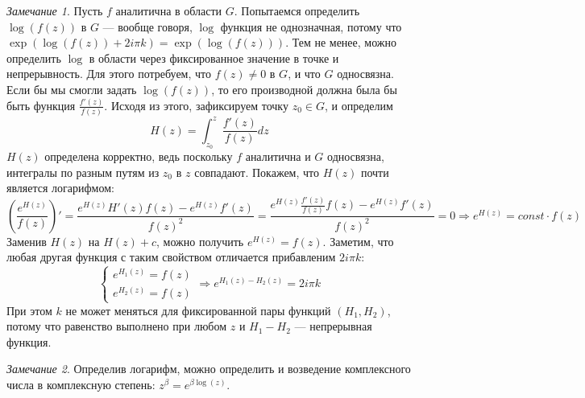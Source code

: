 \documentclass[12pt]{article}
\newcommand{\Ra}{\Rightarrow}
\theoremstyle{thmnote}
\theoremstyle{remark}
\newtheorem*{remark}{Замечание}
\theoremstyle{defnote}
\begin{document}
\begin{remark}
    Пусть $f$ аналитична в области $G$. Попытаемся определить $\log(f(z))$ в $G$ --- вообще говоря, $\log$ функция не однозначная, потому что $\exp(\log(f(z)) + 2 i \pi k) = \exp(\log(f(z)))$. Тем не менее, можно определить $\log$ в области через фиксированное значение в точке и непрерывность. Для этого потребуем, что $f(z) \neq 0$ в $G$, и что $G$ односвязна. Если бы мы смогли задать $\log(f(z))$, то его производной должна была бы быть функция $\frac{f'(z)}{f(z)}$. Исходя из этого, зафиксируем точку $z_0 \in G$, и определим
    \begin{equation*}
        H(z) = \int_{z_0}^{z} \frac{f'(z)}{f(z)} dz
    \end{equation*}
    $H(z)$ определена корректно, ведь поскольку $f$ аналитична и $G$ односвязна, интегралы по разным путям из $z_0$ в $z$ совпадают. Покажем, что $H(z)$ почти является логарифмом:
    \begin{equation*}
        \left( \frac{e^{H(z)}}{f(z)} \right)' = \frac{e^{H(z)} H'(z) f(z) - e^{H(z)} f'(z)}{f(z)^2} = \frac{e^{H(z)} \frac{f'(z)}{f(z)} f(z) - e^{H(z)} f'(z)}{f(z)^2} = 0 \Ra e^{H(z)} = const \cdot f(z)
    \end{equation*}
    Заменив $H(z)$ на $H(z) + c$, можно получить $e^{H(z)} = f(z)$. Заметим, что любая другая функция с таким свойством отличается прибавленим $2 i \pi k$:
    \begin{equation*}
        \begin{cases}
            e^{H_1(z)} = f(z) \\ e^{H_2(z)} = f(z)
        \end{cases} \Ra e^{H_1(z) - H_2(z)} = 2 i \pi k
    \end{equation*}
    При этом $k$ не может меняться для фиксированной пары функций $(H_1, H_2)$, потому что равенство выполнено при любом $z$ и $H_1 - H_2$ --- непрерывная функция.
\end{remark}

\begin{remark}
    Определив логарифм, можно определить и возведение комплексного числа в комплексную степень: $z^\beta = e^{\beta \log(z)}$.
\end{remark}
\end{document}
